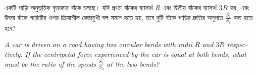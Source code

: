 \documentclass[12pt, a4paper]{article}
\begin{document}
\begin{tcolorbox}[questionbox={প্রশ্ন (Question) 48}]
\noindent
একটি গাড়ি অনুভূমিক বৃত্তাকার বাঁকে চলছে। যদি প্রথম বাঁকের ব্যাসার্ধ $R$ এবং দ্বিতীয় বাঁকের ব্যাসার্ধ $3R$ হয়, এবং উভয় বাঁকে গাড়িটির ওপর ক্রিয়াশীল কেন্দ্রমুখী বল সমান হতে হয়, তবে দুটি বাঁকে গাড়ির দ্রুতির অনুপাত $\frac{S_1}{S_2}$ কত হতে হবে?

\vspace{0.8em}
\begin{english}
\noindent\textit{\color{darkgray}
A car is driven on a road having two circular bends with radii $R$ and $3R$ respectively. If the centripetal force experienced by the car is equal at both bends, what must be the ratio of the speeds $\frac{S_1}{S_2}$ at the two bends?
}
\end{english}
\end{tcolorbox}
\end{document}
